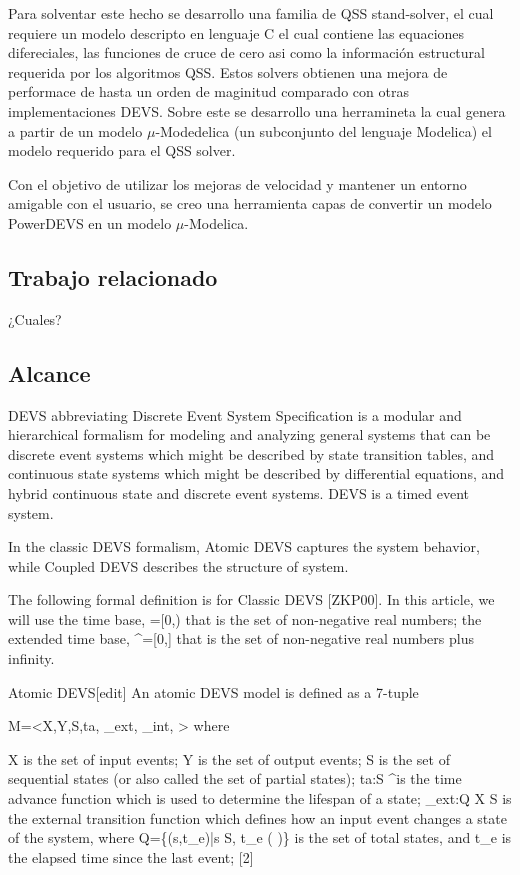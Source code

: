 \documentclass[a4paper,	11pt]{article}
\begin{document}
Para solventar este hecho se desarrollo una familia de QSS stand-solver, el cual requiere un modelo descripto en lenguaje C el cual contiene las equaciones difereciales, las funciones de cruce de cero asi como la información estructural requerida por los algoritmos QSS. Estos solvers obtienen una mejora de performace de hasta un orden de maginitud comparado con otras implementaciones DEVS.
Sobre este se desarrollo una herramineta la cual genera a partir de un modelo $\mu$-Modedelica (un subconjunto del lenguaje Modelica) el modelo requerido para el QSS solver.

Con el objetivo de utilizar los mejoras de velocidad y mantener un entorno amigable con el usuario, se creo una herramienta capas de convertir un modelo PowerDEVS en un modelo $\mu$-Modelica.


\subsection{Trabajo relacionado}
¿Cuales?
\subsection{Alcance}
DEVS abbreviating Discrete Event System Specification is a modular and hierarchical formalism for modeling and analyzing general systems that can be discrete event systems which might be described by state transition tables, and continuous state systems which might be described by differential equations, and hybrid continuous state and discrete event systems. DEVS is a timed event system.

In the classic DEVS formalism, Atomic DEVS captures the system behavior, while Coupled DEVS describes the structure of system.

The following formal definition is for Classic DEVS [ZKP00]. In this article, we will use the time base,  =[0,\infty) that is the set of non-negative real numbers; the extended time base, ^\infty=[0,\infty] that is the set of non-negative real numbers plus infinity.

Atomic DEVS[edit]
An atomic DEVS model is defined as a 7-tuple

M=<X,Y,S,ta, \delta_{ext}, \delta_{int}, \lambda>
where

X is the set of input events;
Y is the set of output events;
S is the set of sequential states (or also called the set of partial states);
ta:S \rightarrow {}^\infty is the time advance function which is used to determine the lifespan of a state;
\delta_{ext}:Q \times X \rightarrow  S  is the external transition function which defines how an input event changes a state of the system, where Q=\{(s,t_e)|s \in S, t_e \in ( \cap [0, ta(s)])\} is the set of total states, and t_e is the elapsed time since the last event;
[2]
\end{document}
